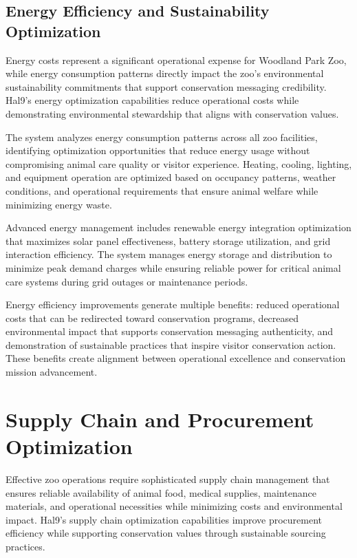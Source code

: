\documentclass[
  Letterpaper,
]{scrbook}
\begin{document}
\subsection{Energy Efficiency and Sustainability
Optimization}\label{energy-efficiency-and-sustainability-optimization}

Energy costs represent a significant operational expense for Woodland
Park Zoo, while energy consumption patterns directly impact the zoo's
environmental sustainability commitments that support conservation
messaging credibility. Hal9's energy optimization capabilities reduce
operational costs while demonstrating environmental stewardship that
aligns with conservation values.

The system analyzes energy consumption patterns across all zoo
facilities, identifying optimization opportunities that reduce energy
usage without compromising animal care quality or visitor experience.
Heating, cooling, lighting, and equipment operation are optimized based
on occupancy patterns, weather conditions, and operational requirements
that ensure animal welfare while minimizing energy waste.

Advanced energy management includes renewable energy integration
optimization that maximizes solar panel effectiveness, battery storage
utilization, and grid interaction efficiency. The system manages energy
storage and distribution to minimize peak demand charges while ensuring
reliable power for critical animal care systems during grid outages or
maintenance periods.

Energy efficiency improvements generate multiple benefits: reduced
operational costs that can be redirected toward conservation programs,
decreased environmental impact that supports conservation messaging
authenticity, and demonstration of sustainable practices that inspire
visitor conservation action. These benefits create alignment between
operational excellence and conservation mission advancement.

\section{Supply Chain and Procurement
Optimization}\label{supply-chain-and-procurement-optimization}

Effective zoo operations require sophisticated supply chain management
that ensures reliable availability of animal food, medical supplies,
maintenance materials, and operational necessities while minimizing
costs and environmental impact. Hal9's supply chain optimization
capabilities improve procurement efficiency while supporting
conservation values through sustainable sourcing practices.
\end{document}
